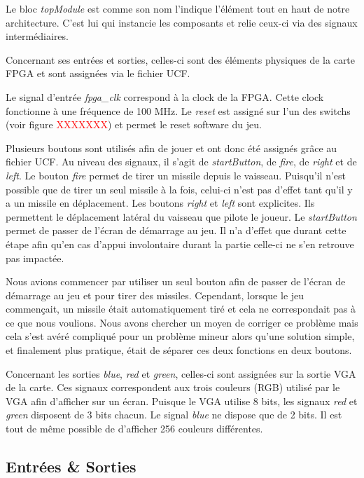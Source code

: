 \documentclass[french]{nakrule}
\begin{document}
Le bloc \emph{topModule} est comme son nom l'indique l'élément tout en haut de notre architecture. C'est lui qui instancie les composants et relie ceux-ci via des signaux intermédiaires. 

Concernant ses entrées et sorties, celles-ci sont des éléments physiques de la carte FPGA et sont assignées via le fichier UCF. 

Le signal d'entrée \emph{fpga\_clk} correspond à la clock de la FPGA. Cette
clock fonctionne à une fréquence de 100 MHz. Le \emph{reset} est assigné sur l'un des switchs (voir figure \textcolor{red}{XXXXXXX}) et permet le reset software du jeu.

Plusieurs boutons sont utilisés afin de jouer et ont donc été assignés grâce au fichier UCF. Au niveau des signaux, il s'agit de \emph{startButton}, de \emph{fire}, de \emph{right} et de \emph{left}. 
Le bouton \emph{fire} permet de tirer un missile depuis le vaisseau. Puisqu'il n'est possible que de tirer un seul missile à la fois, celui-ci n'est pas d'effet tant qu'il y a un missile en déplacement. 
Les boutons \emph{right} et \emph{left} sont explicites. Ils permettent le déplacement latéral du vaisseau que pilote le joueur.
Le \emph{startButton} permet de passer de l'écran de démarrage au jeu. Il n'a d'effet que durant cette étape afin qu'en cas d'appui involontaire durant la partie celle-ci ne s'en retrouve pas impactée.

Nous avions commencer par utiliser un seul bouton afin de passer de l'écran de démarrage au jeu et pour tirer des missiles. Cependant, lorsque le jeu commençait, un missile était automatiquement tiré et cela ne correspondait pas à ce que nous voulions. Nous avons chercher un moyen de corriger ce problème mais cela s'est avéré compliqué pour un problème mineur alors qu'une solution simple, et finalement plus pratique, était de séparer ces deux fonctions en deux boutons.

Concernant les sorties \emph{blue}, \emph{red} et \emph{green}, celles-ci sont assignées sur la sortie VGA de la carte. Ces signaux correspondent aux trois couleurs (RGB) utilisé par le VGA afin d'afficher sur un écran. Puisque le VGA utilise 8 bits, les signaux \emph{red} et \emph{green} disposent de 3 bits chacun. Le signal \emph{blue} ne dispose que de 2 bits.
Il est tout de même possible de d'afficher 256 couleurs différentes.

\subsection{Entrées \& Sorties}
\label{subsec:Entrées_Sorties_topModule}
\end{document}
